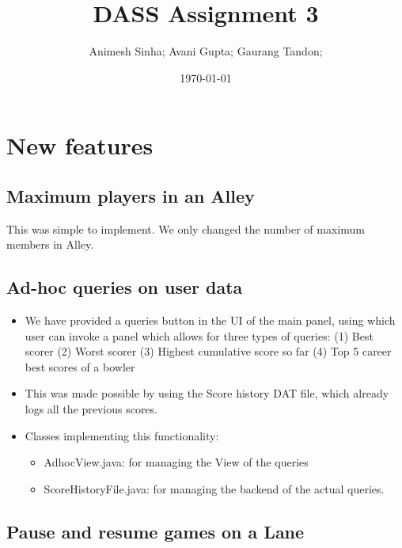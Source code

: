 \documentclass{article}
\title{DASS Assignment 3}
\date{\today}
\author{Animesh Sinha; Avani Gupta; Gaurang Tandon;}
\begin{document}

\maketitle
\newcommand{\code}[1]{\texttt{#1}}


\section{New features}

\subsection{Maximum players in an Alley}

This was simple to implement. We only changed the number of maximum members in Alley.

\subsection{Ad-hoc queries on user data}

\begin{itemize}
    \item We have provided a queries button in the UI of the main panel, using which user can invoke a panel which allows for three types of queries: (1) Best scorer (2) Worst scorer (3) Highest cumulative score so far (4) Top 5 career best scores of a bowler
    \item This was made possible by using the Score history DAT file, which already logs all the previous scores.
    \item Classes implementing this functionality:
          \begin{itemize}
              \item AdhocView.java: for managing the View of the queries
              \item ScoreHistoryFile.java: for managing the backend of the actual queries.
          \end{itemize}
\end{itemize}

\subsection{Pause and resume games on a Lane}
\end{document}
